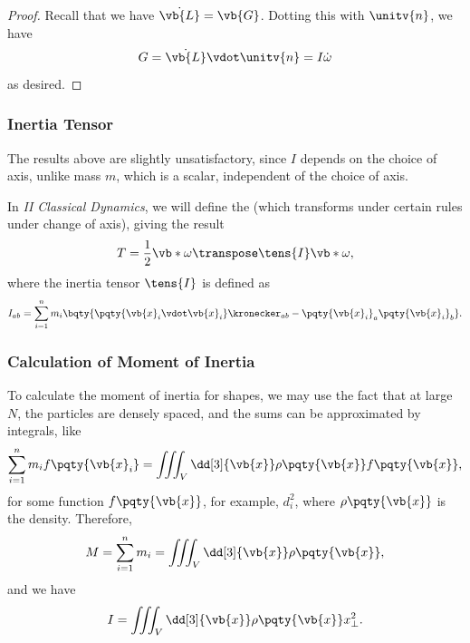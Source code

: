 \begin{proof}
    Recall that we have \(\dot{\vb{L}} = \vb{G}\). Dotting this with \(\unitv{n}\), we have
    \begin{equation}
        G = \dot{\vb{L}} \vdot \unitv{n} = I \dot{\omega}
    \end{equation}
    as desired.
\end{proof}

\subsubsection{Inertia Tensor}

The results above are slightly unsatisfactory, since \(I\) depends on the choice of axis, unlike mass \(m\), which is a scalar, independent of the choice of axis.

In \textit{II Classical Dynamics}, we will define the  (which transforms under certain rules under change of axis), giving the result
\begin{equation}
    T = \frac{1}{2} \vb*{\omega}\transpose  \tens{I}  \vb*{\omega},
\end{equation}
where the inertia tensor \(\tens{I}\) is defined as
\begin{equation}
    I_{ab} = \sum_{i = 1}^{n} m_i \bqty{\pqty{\vb{x}_i \vdot \vb{x}_i} \kronecker_{ab} - \pqty{\vb{x}_i}_a \pqty{\vb{x}_i}_b}.
\end{equation}

\subsubsection{Calculation of Moment of Inertia}

To calculate the moment of inertia for shapes, we may use the fact that at large \(N\), the particles are densely spaced, and the sums can be approximated by integrals, like
\begin{equation}
    \sum_{i = 1}^{n} m_i f\pqty{\vb{x}_i} = \iiint_{V} \dd[3]{\vb{x}} \rho\pqty{\vb{x}} f\pqty{\vb{x}},
\end{equation}
for some function \(f\pqty{\vb{x}}\), for example, \(d_i^2\), where \(\rho\pqty{\vb{x}}\) is the density. Therefore,
\begin{equation}
    M = \sum_{i = 1}^{n} m_i = \iiint_V \dd[3]{\vb{x}} \rho\pqty{\vb{x}},
\end{equation}
and we have
\begin{equation}
    I = \iiint_V \dd[3]{\vb{x}} \rho\pqty{\vb{x}} x_{\perp}^2.
\end{equation}

